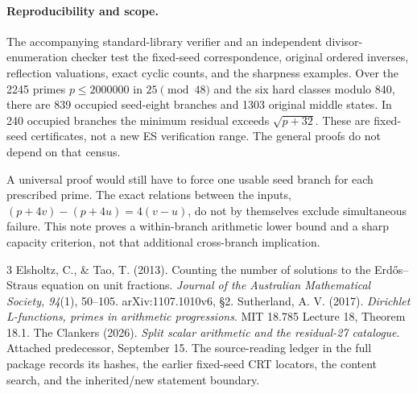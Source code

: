 \documentclass[10pt,a4paper]{article}
\begin{document}
\paragraph{Reproducibility and scope.}
The accompanying standard-library verifier and an independent divisor-enumeration
checker test the fixed-seed correspondence, original ordered inverses, reflection
valuations, exact cyclic counts, and the sharpness examples. Over the 2245 primes
$p\le2000000$ in $25\pmod{48}$ and the six hard classes modulo 840, there are
839 occupied seed-eight branches and 1303 original middle states. In 240 occupied
branches the minimum residual exceeds $\sqrt{p+32}$. These are fixed-seed
certificates, not a new ES verification range. The general proofs do not depend
on that census.

A universal proof would still have to force one usable seed branch for each
prescribed prime. The exact relations between the inputs,
$(p+4v)-(p+4u)=4(v-u)$, do not by themselves exclude simultaneous failure.
This note proves a within-branch arithmetic lower bound and a sharp capacity
criterion, not that additional cross-branch implication.

\begingroup\small
\begin{thebibliography}{3}
 Elsholtz, C., \& Tao, T. (2013). Counting the number of solutions
to the Erd\H{o}s--Straus equation on unit fractions. \emph{Journal of the Australian
Mathematical Society, 94}(1), 50--105. arXiv:1107.1010v6, \S2.
 Sutherland, A. V. (2017). \emph{Dirichlet L-functions, primes in
arithmetic progressions}. MIT 18.785 Lecture 18, Theorem 18.1.
 The Clankers (2026). \emph{Split scalar arithmetic and the
residual-27 catalogue}. Attached predecessor, September 15. The source-reading
ledger in the full package records its hashes, the earlier fixed-seed CRT
locators, the content search, and the inherited/new statement boundary.
\end{thebibliography}
\endgroup
\end{document}
